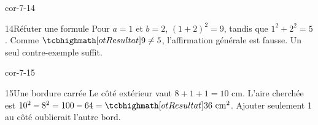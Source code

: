 \begin{blocLivre}{cor-7-14}\begin{corrige}{14}{Réfuter une formule}
Pour $a=1$ et $b=2$, $(1+2)^2=9$, tandis que $1^2+2^2=5$. Comme $\res{9\ne5}$, l’affirmation générale est fausse. Un seul contre-exemple suffit.
\end{corrige}\end{blocLivre}
\begin{blocLivre}{cor-7-15}\begin{corrige}{15}{Une bordure carrée}
Le côté extérieur vaut $8+1+1=10$ cm. L’aire cherchée est $10^2-8^2=100-64=\res{36\ \mathrm{cm}^2}$. Ajouter seulement 1 au côté oublierait l’autre bord.
\label{fig-cor-7-15}
\end{corrige}\end{blocLivre}
